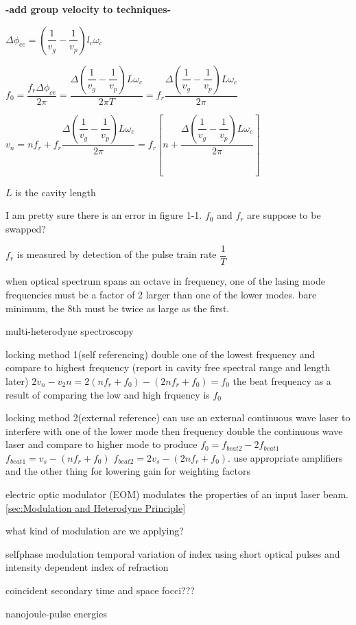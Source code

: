 \documentclass[11pt,a4paper]{book}
\begin{document}
{\bfseries -add group velocity to techniques-}

$\Delta \phi_{ce} = \left( \dfrac{1}{v_g} - \dfrac{1}{v_p} \right) l_c \omega_c$

$f_0 = \dfrac{f_r \Delta \phi_{ce}}{2\pi}= \dfrac{\Delta \left( \dfrac{1}{v_g} - \dfrac{1}{v_p} \right) L \omega_c}{2\pi T} = f_r \dfrac{\Delta \left( \dfrac{1}{v_g} - \dfrac{1}{v_p} \right) L \omega_c}{2\pi}$

$v_n = nf_r + f_r \dfrac{\Delta \left( \dfrac{1}{v_g} - \dfrac{1}{v_p} \right) L \omega_c}{2\pi} = f_r \left[ n+\dfrac{\Delta \left( \dfrac{1}{v_g} - \dfrac{1}{v_p} \right) L \omega_c}{2\pi} \right]$

$L$ is the cavity length

I am pretty sure there is an error in figure 1-1. $f_0$ and $f_r$ are suppose to be swapped?

$f_r$ is measured by detection of the pulse train rate $\dfrac{1}{T}$

when optical spectrum spans an octave in frequency, one of the lasing mode frequencies must be a factor of 2 larger than one of the lower modes. bare minimum, the 8th must be twice as large as the first.

multi-heterodyne spectroscopy

locking method 1(self referencing)
double one of the lowest frequency and compare to highest frequency (report in cavity free spectral range and length later)
$2v_n - v_2n = 2 ( n f_r + f_0)-( 2nf_r + f_0) = f_0$
the beat frequency as a result of comparing the low and high frquency is $f_0$

locking method 2(external reference)
can use an external continuous wave laser to interfere with one of the lower mode then frequency double the continuous wave laser and compare to higher mode to produce $f_0 = f_{beat2} - 2 f_{beat1}$ $f_{beat1}=v_s - (nf_r +f_0)$ $f_{beat2} = 2v_s - (2nf_r +f_0)$. use appropriate amplifiers and the other thing for lowering gain for weighting factors

electric optic modulator (EOM) modulates the properties of an input laser beam. \autoref{sec:Modulation and Heterodyne Principle}

what kind of modulation are we applying?

selfphase modulation temporal variation of index using short optical pulses and intensity dependent index of refraction

coincident secondary time and space focci???

nanojoule-pulse energies
\end{document}
